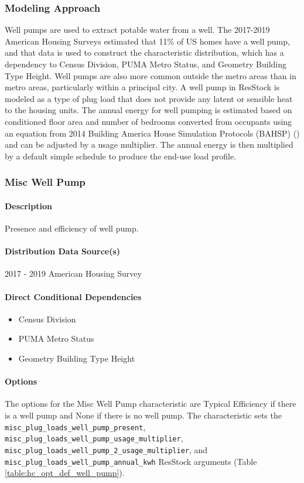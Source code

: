 \subsubsection{Modeling Approach}
Well pumps are used to extract potable water from a well. The 2017-2019 American Housing Surveys estimated that 11\% of US homes have a well pump, and that data is used to construct the characteristic distribution, which has a dependency to Census Division, PUMA Metro Status, and Geometry Building Type Height. Well pumps are also more common outside the metro areas than in metro areas, particularly within a principal city. A well pump in ResStock is modeled as a type of plug load that does not provide any latent or sensible heat to the housing units. The annual energy for well pumping is estimated based on conditioned floor area and number of bedrooms converted from occupants using an equation from 2014 Building America House Simulation Protocols (BAHSP) (\cite{Wilson2014}) and can be adjusted by a usage multiplier. The annual energy is then multiplied by a default simple schedule to produce the end-use load profile. 

\subsubsection{Misc Well Pump}
\paragraph{Description}
Presence and efficiency of well pump.

\paragraph{Distribution Data Source(s)}
2017 - 2019 American Housing Survey
\paragraph{Direct Conditional Dependencies}
\begin{itemize}
    \item Census Division
    \item PUMA Metro Status
    \item Geometry Building Type Height
\end{itemize}

\paragraph{Options}
The options for the Misc Well Pump characteristic are Typical Efficiency if there is a well pump and None if there is no well pump. The characteristic sets the \texttt{misc\_plug\_loads\_well\_pump\_present}, \texttt{misc\_plug\_loads\_well\_pump\_usage\_multiplier}, \texttt{misc\_plug\_loads\_well\_pump\_2\_usage\_multiplier}, and \texttt{misc\_plug\_loads\_well\_pump\_annual\_kwh} ResStock arguments (Table \ref{table:hc_opt_def_well_pump}). 

